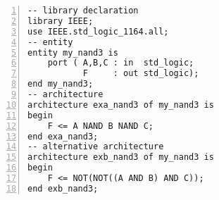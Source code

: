 \noindent
\begin{minipage}{0.5\linewidth}
\begin{lstlisting}[numbers=left,label=example_1, caption=Solution of Example 1.]
-- library declaration
library IEEE;
use IEEE.std_logic_1164.all;
-- entity
entity my_nand3 is
	port ( A,B,C : in  std_logic;
	       F     : out std_logic);
end my_nand3;
-- architecture
architecture exa_nand3 of my_nand3 is
begin
	F <= A NAND B NAND C;
end exa_nand3;
-- alternative architecture
architecture exb_nand3 of my_nand3 is
begin
	F <= NOT(NOT((A AND B) AND C));
end exb_nand3;
\end{lstlisting}
\end{minipage}
\begin{minipage}{0.4\linewidth}
\begin{flushright}
\end{flushright}
\end{minipage}

